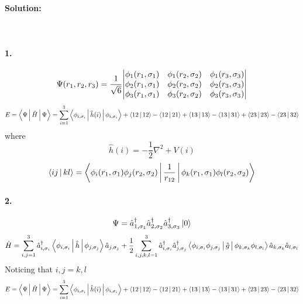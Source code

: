 \documentclass[a4paper]{article}
\numberwithin{equation}{section}
\begin{document}
\paragraph{Solution:}~\\
\paragraph{1.}
\begin{equation}\label{key}
	\Psi(r_1,r_2,r_3) = \dfrac{1}{\sqrt{6}}\mqty|\phi_1(r_1,\sigma_1) & \phi_1(r_2,\sigma_2) & \phi_1(r_3,\sigma_3) \\ \phi_2(r_1,\sigma_1) & \phi_2(r_2,\sigma_2) & \phi_2(r_3,\sigma_3) \\ \phi_3(r_1,\sigma_1) & \phi_3(r_2,\sigma_2) & \phi_3(r_3,\sigma_3) |
\end{equation}
\begin{equation}\label{key}
	E = \Braket{\Psi | \hat H | \Psi} = \sum_{i=1}^3 \Braket{\phi_{i,\sigma_i} | \hat h(i) | \phi_{i,\sigma_i}} + \Braket{12|12} - \Braket{12|21} + \Braket{13|13} - \Braket{13|31} + \Braket{23|23} - \Braket{23|32}
\end{equation}
where
\begin{equation}\label{key}
	\hat h(i) = -\dfrac{1}{2}\nabla^2 + V(i)
\end{equation}
\begin{equation}\label{key}
	\Braket{ij|kl} = \Braket{\phi_i(r_1,\sigma_1)\phi_j(r_2,\sigma_2) | \dfrac{1}{r_{12}} | \phi_k(r_1,\sigma_1) \phi_l(r_2,\sigma_2) }
\end{equation}

\paragraph{2.}
\begin{equation}\label{key}
	\Psi = \hat a_{1,\sigma_1}^\dagger \hat a_{2,\sigma_2}^\dagger \hat a_{3,\sigma_3}^\dagger \ket{0}
\end{equation}
\begin{equation}\label{key}
\hat H = \sum_{i,j=1}^3  \hat a_{i, \sigma_i}^\dagger \Braket{\phi_{i,\sigma_i} | \hat h |\phi_{j,\sigma_j}} \hat a_{j,\sigma_j} 
	+ \dfrac{1}{2}\sum_{i,j,k,l=1}^3 \hat a_{i, \sigma_i}^\dagger \hat a_{j, \sigma_j}^\dagger \Braket{\phi_{i, \sigma_i} \phi_{j, \sigma_j} | \hat g | \phi_{k,\sigma_k} \phi_{l,\sigma_l}} \hat a_{k,\sigma_k} \hat a_{l,\sigma_l}
\end{equation}
Noticing that $ {i,j} = {k,l} $
\begin{equation}\label{key}
	E = \Braket{\Psi | \hat H | \Psi} = \sum_{i=1}^3 \Braket{\phi_{i,\sigma_i} | \hat h(i) | \phi_{i,\sigma_i}} + \Braket{12|12} - \Braket{12|21} + \Braket{13|13} - \Braket{13|31} + \Braket{23|23} - \Braket{23|32}
\end{equation}
\end{document}
